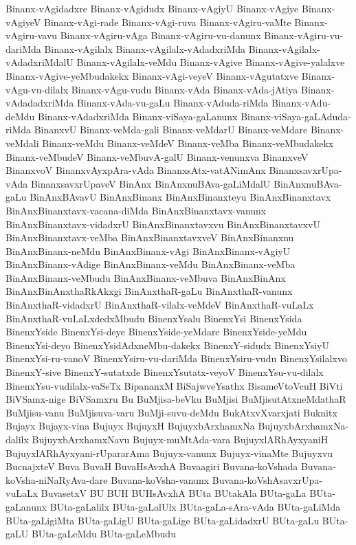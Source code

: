 {Binanx-vAgidadxre
Binanx-vAgidudx
Binanx-vAgiyU
Binanx-vAgiye
Binanx-vAgiyeV
Binanx-vAgi-rade
Binanx-vAgi-ruva
Binanx-vAgiru-vaMte
Binanx-vAgiru-vavu
Binanx-vAgiru-vAga
Binanx-vAgiru-vu-danunx
Binanx-vAgiru-vu-dariMda
Binanx-vAgilalx
Binanx-vAgilalx-vAdadxriMda
Binanx-vAgilalx-vAdadxriMdalU
Binanx-vAgilalx-veMdu
Binanx-vAgive
Binanx-vAgive-yalalxve
Binanx-vAgive-yeMbudakekx
Binanx-vAgi-veyeV
Binanx-vAgutatxve
Binanx-vAgu-vu-dilalx
Binanx-vAgu-vudu
Binanx-vAda
Binanx-vAda-jAtiya
Binanx-vAdadadxriMda
Binanx-vAda-vu-gaLu
Binanx-vAduda-riMda
Binanx-vAdu-deMdu
Binanx-vAdadxriMda
Binanx-viSaya-gaLanunx
Binanx-viSaya-gaLAduda-riMda
BinanxvU
Binanx-veMda-gali
Binanx-veMdarU
Binanx-veMdare
Binanx-veMdali
Binanx-veMdu
Binanx-veMdeV
Binanx-veMba
Binanx-veMbudakekx
Binanx-veMbudeV
Binanx-veMbuvA-galU
Binanx-venunxva
BinanxveV
BinanxvoV
BinanxvAyxpAra-vAda
BinanxsAtx-vatANimAnx
BinanxsavxrUpa-vAda
BinanxsavxrUpaveV
BinAnx
BinAnxnuBAva-gaLiMdalU
BinAnxnuBAva-gaLu
BinAnxBAvavU
BinAnxBinanx
BinAnxBinanxteyu
BinAnxBinanxtavx
BinAnxBinanxtavx-vacana-diMda
BinAnxBinanxtavx-vanunx
BinAnxBinanxtavx-vidadxrU
BinAnxBinanxtavxvu
BinAnxBinanxtavxvU
BinAnxBinanxtavx-veMba
BinAnxBinanxtavxveV
BinAnxBinanxnu
BinAnxBinanx-neMdu
BinAnxBinanx-vAgi
BinAnxBinanx-vAgiyU
BinAnxBinanx-vAdige
BinAnxBinanx-veMdu
BinAnxBinanx-veMba
BinAnxBinanx-veMbudu
BinAnxBinanx-veMbuva
BinAnxBinAnx
BinAnxBinAnxthaRkAkxgi
BinAnxthaR-gaLu
BinAnxthaR-vanunx
BinAnxthaR-vidadxrU
BinAnxthaR-vilalx-veMdeV
BinAnxthaR-vuLaLx
BinAnxthaR-vuLaLxdedxMbudu
BinenxYsalu
BinenxYsi
BinenxYsida
BinenxYside
BinenxYsi-deye
BinenxYside-yeMdare
BinenxYside-yeMdu
BinenxYsi-deyo
BinenxYsidAdxneMbu-dakekx
BinenxY-sidudx
BinenxYsiyU
BinenxYsi-ru-vanoV
BinenxYsiru-vu-dariMda
BinenxYsiru-vudu
BinenxYsilalxvo
BinenxY-sive
BinenxY-sutatxde
BinenxYsutatx-veyoV
BinenxYsu-vu-dilalx
BinenxYsu-vudilalx-vaSeTx
BipananxM
BiSajwveYsathx
BisameVtoVcuH
BiVti
BiVSamx-nige
BiVSamxru
Bu
BuMjisa-beVku
BuMjisi
BuMjisutAtxneMdathaR
BuMjisu-vanu
BuMjisuva-varu
BuMji-suvu-deMdu
BukAtxvXvarxjati
Buknitx
Bujayx
Bujayx-vina
Bujuyx
BujuyxH
BujuyxbArxhamxNa
BujuyxbArxhamxNa-dalilx
BujuyxbArxhamxNavu
Bujuyx-muMtAda-vara
BujuyxlARhAyxyaniH
BujuyxlARhAyxyani-rUpararAma
Bujuyx-vanunx
Bujuyx-vinaMte
Bujuyxvu
BucnajxteV
Buva
BuvaH
BuvaHsAvxhA
Buvaagiri
Buvana-koVshada
Buvana-koVsha-niNaRyAva-dare
Buvana-koVsha-vanunx
Buvana-koVshAsavxrUpa-vuLaLx
BuvasetxV
BU
BUH
BUHsAvxhA
BUta
BUtakAla
BUta-gaLa
BUta-gaLanunx
BUta-gaLalilx
BUta-gaLalUlx
BUta-gaLa-sAra-vAda
BUta-gaLiMda
BUta-gaLigiMta
BUta-gaLigU
BUta-gaLige
BUta-gaLidadxrU
BUta-gaLu
BUta-gaLU
BUta-gaLeMdu
BUta-gaLeMbudu
}

